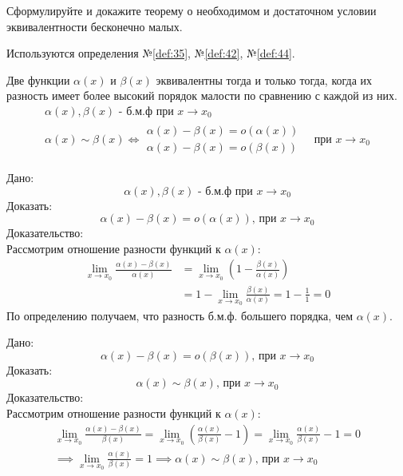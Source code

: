 \begin{question}
    Сформулируйте и докажите теорему о необходимом и достаточном условии эквивалентности бесконечно малых.
\end{question}
\begin{used}
    Используются определения №\ref{def:35}, №\ref{def:42}, №\ref{def:44}.
\end{used}
\begin{theorem}
    Две функции $\alpha(x)$ и $\beta(x)$ эквивалентны тогда и только тогда, когда их разность имеет более высокий порядок малости по сравнению с каждой из них.
    \begin{gather*}
        \alpha(x), \beta(x) \text{ - б.м.ф при } x \to x_0 \\
        \alpha(x) \sim \beta(x) \iff 
        \begin{matrix}
            \alpha(x) - \beta(x) = o(\alpha(x)) \\
            \alpha(x) - \beta(x) = o(\beta(x))
        \end{matrix}
        \quad \text{при } x \to x_0
    \end{gather*}
\end{theorem}
\begin{necessity}
    Дано: \[
        \alpha(x), \beta(x) \text{ - б.м.ф при } x \to x_0
    \] 
    Доказать: \[
        \alpha(x) - \beta(x) = o(\alpha(x)) \text{, при } x \to x_0
    \] 
    Доказательство: \\
    Рассмотрим отношение разности функций к $\alpha(x)$:
    \begin{align*}
        \lim_{x \to x_0} \frac{\alpha(x) - \beta(x)}{\alpha(x)} &= \lim_{x \to x_0} \left( 1 - \frac{\beta(x)}{\alpha(x)} \right) \\
            &= 1 - \lim_{x \to x_0} \frac{\beta(x)}{\alpha(x)} = 1 - \frac{1}{1} = 0
    \end{align*}
    По определению получаем, что разность б.м.ф. большего порядка, чем $\alpha(x)$.
\end{necessity}
\begin{sufficiency}
    Дано: \[
        \alpha(x) - \beta(x) = o(\beta(x)) \text{, при } x \to x_0
    \]
    Доказать: \[
        \alpha(x) \sim \beta(x) \text{, при } x \to x_0
    \] 
    Доказательство: \\
    Рассмотрим отношение разности функций к $\alpha(x)$:
    \begin{gather*}
        \lim_{x \to x_0} \frac{\alpha(x) - \beta(x)}{\beta(x)} = \lim_{x \to x_0} \left( \frac{\alpha(x)}{\beta(x)} - 1 \right) = \lim_{x \to x_0} \frac{\alpha(x)}{\beta(x)} - 1 = 0 \\
        \implies \lim_{x \to x_0} \frac{\alpha(x)}{\beta(x)} = 1 \implies \alpha(x) \sim \beta(x) \text{, при } x \to x_0 
    \end{gather*}
\end{sufficiency}
\pagebreak



